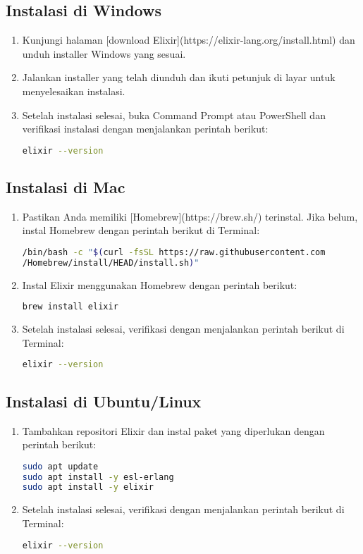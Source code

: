 \subsection{Instalasi di Windows}

\begin{enumerate}
\item Kunjungi halaman [download Elixir](https://elixir-lang.org/install.html) dan unduh installer Windows yang sesuai.
\item Jalankan installer yang telah diunduh dan ikuti petunjuk di layar untuk menyelesaikan instalasi.
\item Setelah instalasi selesai, buka Command Prompt atau PowerShell dan verifikasi instalasi dengan menjalankan perintah berikut:
\begin{lstlisting}[language=bash]
	elixir --version
\end{lstlisting}
\end{enumerate}

\subsection{Instalasi di Mac}

\begin{enumerate}
\item Pastikan Anda memiliki [Homebrew](https://brew.sh/) terinstal. Jika belum, instal Homebrew dengan perintah berikut di Terminal:
\begin{lstlisting}[language=bash]
/bin/bash -c "$(curl -fsSL https://raw.githubusercontent.com
/Homebrew/install/HEAD/install.sh)"
\end{lstlisting}
\item Instal Elixir menggunakan Homebrew dengan perintah berikut:
\begin{lstlisting}[language=bash]
brew install elixir
\end{lstlisting}
\item Setelah instalasi selesai, verifikasi dengan menjalankan perintah berikut di Terminal:
\begin{lstlisting}[language=bash]
elixir --version
\end{lstlisting}
\end{enumerate}

\subsection{Instalasi di Ubuntu/Linux}

\begin{enumerate}
\item Tambahkan repositori Elixir dan instal paket yang diperlukan dengan perintah berikut:
\begin{lstlisting}[language=bash]
sudo apt update
sudo apt install -y esl-erlang
sudo apt install -y elixir
\end{lstlisting}
\item Setelah instalasi selesai, verifikasi dengan menjalankan perintah berikut di Terminal:
\begin{lstlisting}[language=bash]
elixir --version
\end{lstlisting}
\end{enumerate}

